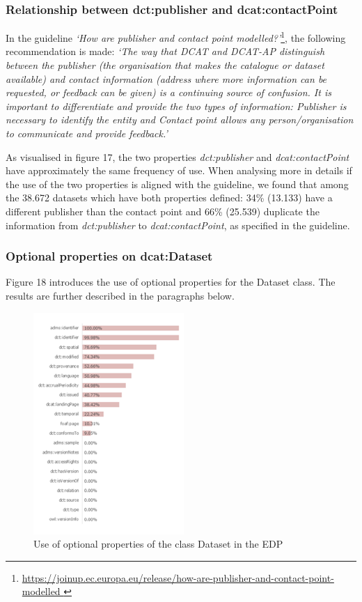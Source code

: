 \documentclass[<options>]{elsarticle}
\begin{document}
\subsubsection{Relationship between dct:publisher and dcat:contactPoint}
In the guideline \textit{‘How are publisher and contact point modelled?’}\footnote{\href{ https://joinup.ec.europa.eu/release/how-are-publisher-and-contact-point-modelled }{ https://joinup.ec.europa.eu/release/how-are-publisher-and-contact-point-modelled }}, the following recommendation is made:
\textit{‘The way that DCAT and DCAT-AP distinguish between the publisher (the organisation that makes the catalogue or dataset available) and contact information (address where more information can be requested, or feedback can be given) is a continuing source of confusion. It is important to differentiate and provide the two types of information: Publisher is necessary to identify the entity and Contact point allows any person/organisation to communicate and provide feedback.’}

As visualised in figure 17, the two properties \textit{dct:publisher} and \textit{dcat:contactPoint} have approximately the same frequency of use. When analysing more in details if the use of the two properties is aligned with the guideline, we found that among the 38.672 datasets which have both properties defined: 34\% (13.133) have a different publisher than the contact point and 66\% (25.539) duplicate the information from \textit{dct:publisher} to \textit{dcat:contactPoint}, as specified in the guideline.

\subsubsection{Optional properties on dcat:Dataset}

Figure 18 introduces the use of optional properties for the Dataset class. The results are further described in the paragraphs below.
\\
\begin{figure}[H]
\includegraphics{replace21.png}
\caption{Use of optional properties of the class Dataset in the EDP}
\end{figure}
\end{document}
